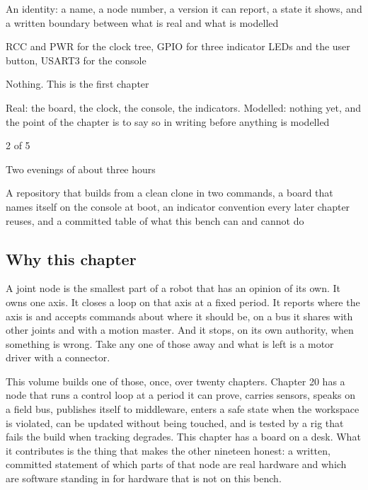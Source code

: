 
\begin{keyfacts}
\item[Adds to the node] An identity: a name, a node number, a version it can report, a state it shows, and a written boundary between what is real and what is modelled
\item[Peripherals] RCC and PWR for the clock tree, GPIO for three indicator LEDs and the user button, USART3 for the console
\item[Depends on] Nothing. This is the first chapter
\item[Real or modelled] Real: the board, the clock, the console, the indicators. Modelled: nothing yet, and the point of the chapter is to say so in writing before anything is modelled
\item[Difficulty] 2 of 5
\item[Effort] Two evenings of about three hours
\item[Deliverable] A repository that builds from a clean clone in two commands, a board that names itself on the console at boot, an indicator convention every later chapter reuses, and a committed table of what this bench can and cannot do
\end{keyfacts}

\subsection*{Why this chapter}

A joint node is the smallest part of a robot that has an opinion of its own. It
owns one axis. It closes a loop on that axis at a fixed period. It reports where
the axis is and accepts commands about where it should be, on a bus it shares
with other joints and with a motion master. And it stops, on its own authority,
when something is wrong. Take any one of those away and what is left is a motor
driver with a connector.

This volume builds one of those, once, over twenty chapters. Chapter 20 has a
node that runs a control loop at a period it can prove, carries sensors, speaks
on a field bus, publishes itself to middleware, enters a safe state when the
workspace is violated, can be updated without being touched, and is tested by a
rig that fails the build when tracking degrades. This chapter has a board on a
desk. What it contributes is the thing that makes the other nineteen honest: a
written, committed statement of which parts of that node are real hardware and
which are software standing in for hardware that is not on this bench.

